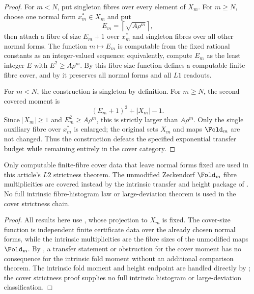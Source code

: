 \begin{proof}
For \(m<N\), put singleton fibres over every element of \(X_m\).  For
\(m\ge N\), choose one normal form \(x_m^\ast\in X_m\) and put
\[
  E_m=\left\lceil \sqrt{A\rho^m}\right\rceil,
\]
then attach a fibre of size \(E_m+1\) over \(x_m^\ast\) and singleton fibres over
all other normal forms.  The function \(m\mapsto E_m\) is computable from the
fixed rational constants as an integer-valued sequence; equivalently, compute
\(E_m\) as the least integer \(E\) with \(E^2\ge A\rho^m\).  By
 this fibre-size function defines a
computable finite-fibre cover, and by  it
preserves all normal forms and all \(L1\) readouts.

For \(m<N\), the construction is singleton by definition.  For \(m\ge N\), the
second covered moment is
\[
  (E_m+1)^2+|X_m|-1.
\]
Since \(|X_m|\ge1\) and \(E_m^2\ge A\rho^m\), this is strictly larger than
\(A\rho^m\).  Only the single auxiliary fibre over \(x_m^\ast\) is enlarged;
the original sets \(X_m\) and maps \(\Fold_m\) are not changed.  Thus the
construction defeats the specified exponential transfer budget while remaining
entirely in the cover category.
\end{proof}

\begin{theorem}
\label{thm:L2-main-article-boundary}
Only computable finite-fibre cover data that leave normal forms fixed are used
in this article's \(L2\) strictness theorem.  The unmodified Zeckendorf
\(\Fold_m\) fibre multiplicities are covered instead by the intrinsic transfer
and height package of
.
No full intrinsic fibre-histogram law or large-deviation theorem is used in the
cover strictness chain.
\end{theorem}

\begin{proof}
All results here use , whose projection to
\(X_m\) is fixed.  The cover-size function is independent finite certificate data
over the already chosen normal forms, while the intrinsic multiplicities are the
fibre sizes of the unmodified maps \(\Fold_m\).  By
, a transfer statement or obstruction
for the cover moment has no consequence for the intrinsic fold moment without an
additional comparison theorem.  The intrinsic fold moment and height endpoint are
handled directly by
; the cover strictness proof supplies no
full intrinsic histogram or large-deviation classification.
\end{proof}

